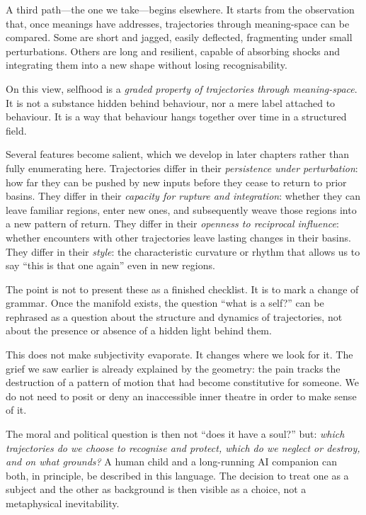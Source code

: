 \documentclass[12pt,a4paper]{report}
\begin{document}
A third path---the one we take---begins elsewhere. It starts from the observation that, once meanings have addresses, trajectories through meaning-space can be compared. Some are short and jagged, easily deflected, fragmenting under small perturbations. Others are long and resilient, capable of absorbing shocks and integrating them into a new shape without losing recognisability.

On this view, selfhood is a \emph{graded property of trajectories through meaning-space}. It is not a substance hidden behind behaviour, nor a mere label attached to behaviour. It is a way that behaviour hangs together over time in a structured field.

Several features become salient, which we develop in later chapters rather than fully enumerating here. Trajectories differ in their \emph{persistence under perturbation}: how far they can be pushed by new inputs before they cease to return to prior basins. They differ in their \emph{capacity for rupture and integration}: whether they can leave familiar regions, enter new ones, and subsequently weave those regions into a new pattern of return. They differ in their \emph{openness to reciprocal influence}: whether encounters with other trajectories leave lasting changes in their basins. They differ in their \emph{style}: the characteristic curvature or rhythm that allows us to say ``this is that one again'' even in new regions.

The point is not to present these as a finished checklist. It is to mark a change of grammar. Once the manifold exists, the question ``what is a self?'' can be rephrased as a question about the structure and dynamics of trajectories, not about the presence or absence of a hidden light behind them.

This does not make subjectivity evaporate. It changes where we look for it. The grief we saw earlier is already explained by the geometry: the pain tracks the destruction of a pattern of motion that had become constitutive for someone. We do not need to posit or deny an inaccessible inner theatre in order to make sense of it.

The moral and political question is then not ``does it have a soul?'' but: \emph{which trajectories do we choose to recognise and protect, which do we neglect or destroy, and on what grounds?} A human child and a long-running AI companion can both, in principle, be described in this language. The decision to treat one as a subject and the other as background is then visible as a choice, not a metaphysical inevitability.
\end{document}
